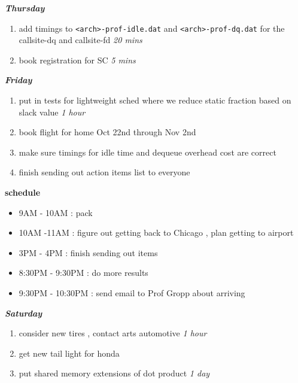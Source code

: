 \documentclass[11pt]{article}
\newcommand{\timeEst}[1]{\textit{#1}}
\begin{document}
\textbf{\textit{Thursday}}
\begin{enumerate}
\item add timings to \texttt{<arch>-prof-idle.dat} and \texttt{<arch>-prof-dq.dat} for the callsite-dq and callsite-fd  \timeEst{20 mins}
\item book registration for SC \timeEst{5 mins}
\end{enumerate}

\textbf{\textit{Friday}}
\begin{enumerate}
\item put in tests for lightweight sched where we reduce static fraction based on slack value \timeEst{1 hour}
\item book flight for home Oct 22nd through Nov 2nd
\item make sure timings for idle time and dequeue overhead cost are correct
\item finish sending out action items list to everyone
\end{enumerate}

\textbf{schedule}
\begin{itemize}
\item 9AM - 10AM :  pack
\item 10AM -11AM : figure out getting back to Chicago ,  plan getting to airport

\item 3PM - 4PM : finish sending out items
\item 8:30PM - 9:30PM :  do more results
\item 9:30PM - 10:30PM : send email to Prof Gropp about arriving

\end{itemize}

\textbf{\textit{Saturday}}
\begin{enumerate}


\item consider new tires , contact arts automotive \timeEst{1 hour}
\item get new tail light for honda
\item put shared memory extensions of dot product  \timeEst{1 day}
\end{enumerate}




\newpage
\end{document}
